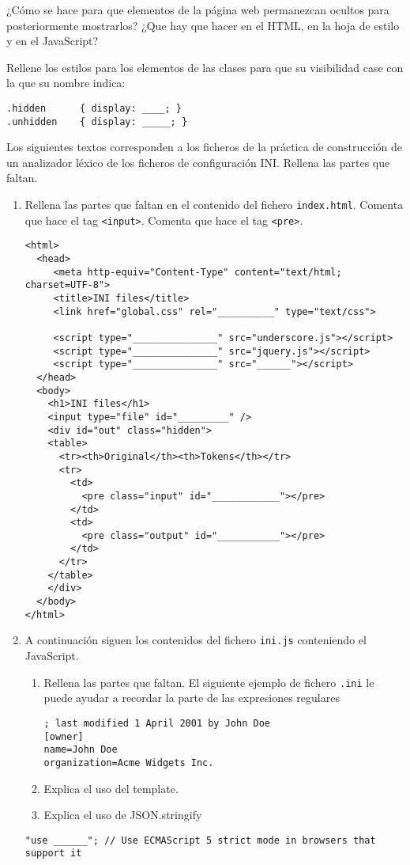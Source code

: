 \item  ¿Cómo se hace para que elementos de la página web permanezcan ocultos para 
posteriormente mostrarlos? ¿Que hay que hacer en el HTML, en la hoja de estilo y en el JavaScript?
\item Rellene los estilos para los elementos de las clases para que su visibilidad
case con la que su nombre indica:
\begin{verbatim}
.hidden      { display: ____; }
.unhidden    { display: _____; }
\end{verbatim}
\item 
Los siguientes textos corresponden  a los ficheros de 
la práctica 
de construcción de un analizador léxico de los ficheros de configuración INI. 
Rellena las partes que faltan.
\begin{enumerate}
\item  Rellena las partes que faltan en el contenido del fichero \verb|index.html|. 
Comenta que hace el tag \verb|<input>|.
Comenta que hace el tag \verb|<pre>|.
\begin{verbatim}
<html>
  <head>
     <meta http-equiv="Content-Type" content="text/html; charset=UTF-8">
     <title>INI files</title>
     <link href="global.css" rel="__________" type="text/css">

     <script type="_______________" src="underscore.js"></script>
     <script type="_______________" src="jquery.js"></script>
     <script type="_______________" src="______"></script>
  </head>
  <body>
    <h1>INI files</h1>
    <input type="file" id="_________" />
    <div id="out" class="hidden">
    <table>
      <tr><th>Original</th><th>Tokens</th></tr>
      <tr>
        <td>
          <pre class="input" id="____________"></pre>
        </td>
        <td>
          <pre class="output" id="___________"></pre>
        </td>
      </tr>
    </table>
    </div>
  </body>
</html>
\end{verbatim}

\item 
A continuación siguen los contenidos del fichero \verb|ini.js| conteniendo el JavaScript.
\begin{enumerate}
\item 
Rellena las partes que faltan. 
El siguiente ejemplo de fichero \verb|.ini| le puede ayudar
a recordar la parte de las expresiones regulares 
\begin{verbatim}
; last modified 1 April 2001 by John Doe
[owner]
name=John Doe
organization=Acme Widgets Inc.
\end{verbatim}
\item 
Explica 
el uso del template.
\item 
Explica el uso de JSON.stringify
\end{enumerate}
\begin{verbatim}
"use ______"; // Use ECMAScript 5 strict mode in browsers that support it


\end{verbatim}
\end{enumerate}

